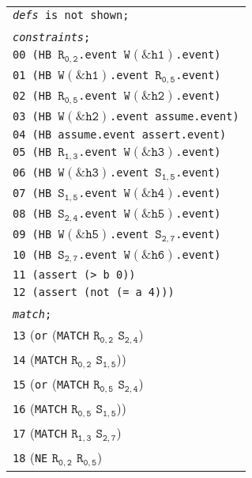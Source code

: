 \newsavebox{\boxSMTc}
\begin{lrbox}{\boxSMTc}
\normalsize
\begin{tabular}[t]{l}
\texttt{\textit{defs} is not shown;}\\
\\
\texttt{\textit{constraints};}\\
\texttt{00 (HB $\mathtt{R_{0,2}}$.event $\mathtt{W(\&h1)}$.event)}\\
\texttt{01 (HB $\mathtt{W(\&h1)}$.event $\mathtt{R_{0,5}}$.event)}\\
\texttt{02 (HB $\mathtt{R_{0,5}}$.event $\mathtt{W(\&h2)}$.event)}\\
\texttt{03 (HB $\mathtt{W(\&h2)}$.event assume.event)}\\
\texttt{04 (HB assume.event assert.event)}\\
\texttt{05 (HB $\mathtt{R_{1,3}}$.event $\mathtt{W(\&h3)}$.event)}\\
\texttt{06 (HB $\mathtt{W(\&h3)}$.event $\mathtt{S_{1,5}}$.event)}\\
\texttt{07 (HB $\mathtt{S_{1,5}}$.event $\mathtt{W(\&h4)}$.event)}\\
\texttt{08 (HB $\mathtt{S_{2,4}}$.event $\mathtt{W(\&h5)}$.event)}\\
\texttt{09 (HB $\mathtt{W(\&h5)}$.event $\mathtt{S_{2,7}}$.event)}\\
\texttt{10 (HB $\mathtt{S_{2,7}}$.event $\mathtt{W(\&h6)}$.event)}\\
\texttt{11 (assert (> b 0))}\\
\texttt{12 (assert (not (= a 4)))}\\
\\
\texttt{\textit{match};}\\
\texttt{13} (\texttt{or} (\texttt{MATCH} $\mathtt{R_{0,2}}$ $\mathtt{S_{2,4}}$)\\
\texttt{14}     (\texttt{MATCH} $\mathtt{R_{0,2}}$ $\mathtt{S_{1,5}}$))\\
\texttt{15} (\texttt{or} (\texttt{MATCH} $\mathtt{R_{0,5}}$ $\mathtt{S_{2,4}}$)\\
\texttt{16}     (\texttt{MATCH} $\mathtt{R_{0,5}}$ $\mathtt{S_{1,5}}$))\\
\texttt{17} (\texttt{MATCH} $\mathtt{R_{1,3}}$ $\mathtt{S_{2,7}}$)\\
\texttt{18} (\texttt{NE} $\mathtt{R_{0,2}}$ $\mathtt{R_{0,5}}$)\\

\end{tabular}
\end{lrbox}

